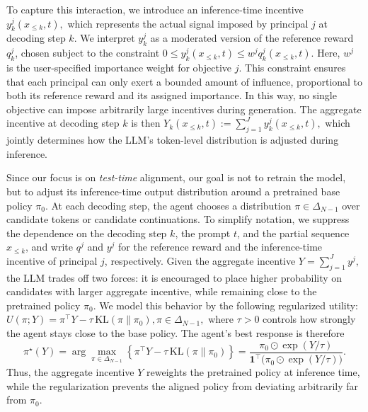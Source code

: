 \documentclass{article}
\begin{document}
To capture this interaction, we introduce an inference-time incentive
\(
y_k^j(x_{\le k}, t),
\)
which represents the actual signal imposed by principal \(j\) at decoding step \(k\). We interpret \(y_k^j\) as a moderated version of the reference reward \(q_k^j\), chosen subject to the constraint
\(
0 \le y_k^j(x_{\le k}, t) \le w^j q_k^j(x_{\le k}, t).
\)
Here, \(w^j\) is the user-specified importance weight for objective \(j\). This constraint ensures that each principal can only exert a bounded amount of influence, proportional to both its reference reward and its assigned importance. In this way, no single objective can impose arbitrarily large incentives during generation.
The aggregate incentive at decoding step \(k\) is then
\(
Y_k(x_{\le k}, t) := \sum_{j=1}^J y_k^j(x_{\le k}, t),
\)
which jointly determines how the LLM's token-level distribution is adjusted during inference.

Since our focus is on \emph{test-time} alignment, our goal is not to retrain the model, but to adjust its inference-time output distribution around a pretrained base policy \(\pi_0\). At each decoding step, the agent chooses a distribution \(\pi \in \Delta_{N-1}\) over candidate tokens or candidate continuations. To simplify notation, we suppress the dependence on the decoding step \(k\), the prompt \(t\), and the partial sequence \(x_{\le k}\), and write \(q^j\) and \(y^j\) for the reference reward and the inference-time incentive of principal \(j\), respectively.
Given the aggregate incentive
\(
Y=\sum_{j=1}^J y^j,
\)
the LLM trades off two forces: it is encouraged to place higher probability on candidates with larger aggregate incentive, while remaining close to the pretrained policy \(\pi_0\). We model this behavior by the following regularized utility:
\(
U(\pi;Y)
=
\pi^\top Y
-
\tau\,\mathrm{KL}(\pi\|\pi_0),
\pi \in \Delta_{N-1},
\)
where \(\tau>0\) controls how strongly the agent stays close to the base policy. The agent's best response is therefore
\[
\pi^\star(Y)
=
\arg\max_{\pi\in\Delta_{N-1}}
\left\{
\pi^\top Y-\tau\,\mathrm{KL}(\pi\|\pi_0)
\right\}
=
\frac{\pi_0\odot \exp(Y/\tau)}
{\mathbf{1}^\top\bigl(\pi_0\odot \exp(Y/\tau)\bigr)}.
\]
Thus, the aggregate incentive \(Y\) reweights the pretrained policy at inference time, while the regularization prevents the aligned policy from deviating arbitrarily far from \(\pi_0\).
\end{document}
